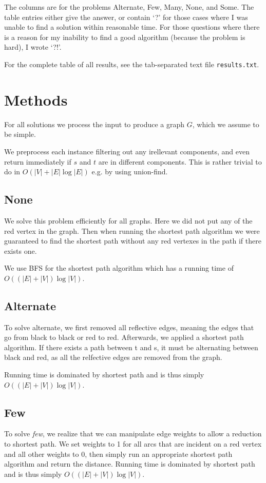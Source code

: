 \documentclass{tufte-handout}
\begin{document}
The columns are for the problems Alternate, Few, Many, None, and Some.
The table entries either give the answer, or contain `?' for those cases where I was unable to find a solution within reasonable time.
For those questions where there is a reason for my inability to find a good algorithm (because the problem is hard), I wrote `?!'.

For the complete table of all results, see the tab-separated text file {\tt results.txt}.

\section{Methods}

For all solutions we process the input to produce a graph $G$,
which we assume to be simple.

We preprocess each instance filtering out any irellevant components,
and even return immediately if $s$ and $t$ are in different components.
This is rather trivial to do in $O(|V|+|E| \log |E|)$ e.g. by using union-find.

\subsection{None}
We solve this problem efficiently for all graphs.
Here we did not put any of the red vertex in the graph.
Then when running the shortest path algorithm we were guaranteed
to find the shortest path without any red vertexes in the path
if there exists one.

We use BFS for the shortest path algorithm which has a 
running time of $O((|E| + |V|) \log |V|)$.

\subsection{Alternate}
To solve alternate, we first removed all reflective edges, 
meaning the edges that go from black to black or red to red.
Afterwards, we applied a shortest path algorithm.
If there exists a path between t and s, it must be 
alternating between black and red, as all the relfective edges are removed from the graph.

Running time is dominated by shortest path and is thus simply
$O((|E|+|V|) \log |V|)$.

\subsection{Few}
To solve \textit{few}, 
we realize that we can manipulate edge weights
to allow a reduction to shortest path.
We set weights to 1 for all arcs that 
are incident on a red vertex and all other weights to 0,
then simply run an appropriate shortest path algorithm 
and return the distance.
Running time is dominated by shortest path and is thus simply
$O((|E|+|V|) \log |V|)$.
\end{document}
